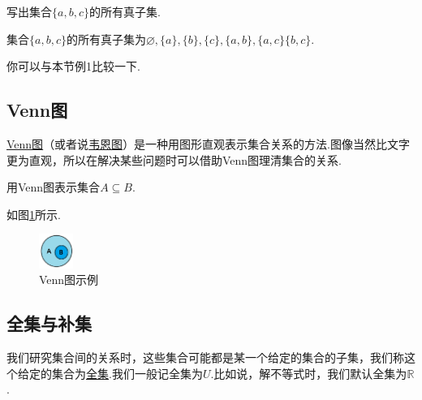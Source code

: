 \documentclass[lang=cn,math=cm,chinesefont=nofont,11pt,scheme=chinese,twocol]{elegantbook}
\begin{document}
\begin{example}
  写出集合$\{a,b,c\}$的所有真子集.
\end{example}
\begin{solution}集合$\{a,b,c\}$的所有真子集为$\varnothing ,\{a\},\{b\},\{c\},\{a,b\},\{a,c\}\{b,c\}$.
\end{solution}

\begin{remark}
  你可以与本节例1比较一下.
\end{remark}

\subsection{Venn图}
  \underline{Venn图}（或者说\underline{韦恩图}）是一种用图形直观表示集合关系的方法.图像当然比文字更为直观，所以在解决某些问题时可以借助Venn图理清集合的关系.

\begin{example}
  用Venn图表示集合$A\subseteq B$.
\end{example}
\begin{solution}
  如图\ref{img:Venn1}所示.
\end{solution}
\begin{figure}[h]
  \centering
  \includegraphics[width=0.1\textwidth]{image/Venn1.png}
  \caption{Venn图示例}
  \label{img:Venn1}
\end{figure}

\subsection{全集与补集}
  我们研究集合间的关系时，这些集合可能都是某一个给定的集合的子集，我们称这个给定的集合为\underline{全集}.我们一般记全集为$U$.比如说，解不等式时，我们默认全集为$\mathbb{R}$.
\end{document}
